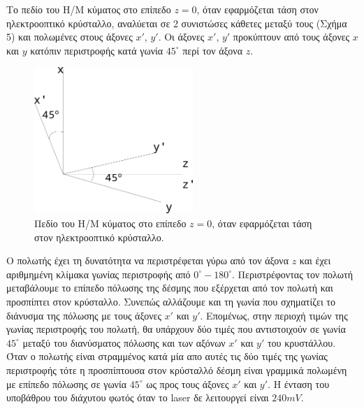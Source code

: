\documentclass[a4paper,11pt,titlepage]{article}
\newcommand{\degrees}{^{\circ}}
\begin{document}
Το πεδίο του Η/Μ κύματος στο επίπεδο $z=0$, όταν εφαρμόζεται τάση στον ηλεκτροοπτικό κρύσταλλο, αναλύεται σε 2 συνιστώσες κάθετες μεταξύ τους (Σχήμα 5) και πολωμένες στους άξονες $x'$, $y'$. Οι άξονες $x'$, $y'$ προκύπτουν από τους άξονες $x$ και $y$ κατόπιν περιστροφής κατά γωνία $45\degrees$ περί τον άξονα $z$.

\begin{figure} [hp]
\centering
\includegraphics[width=60mm]{aksones.png}
\caption{Πεδίο του Η/Μ κύματος στο επίπεδο $z=0$, όταν εφαρμόζεται τάση στον ηλεκτροοπτικό κρύσταλλο.}
\end{figure}

Ο πολωτής έχει τη δυνατότητα να περιστρέφεται γύρω από τον άξονα $z$ και έχει αριθμημένη κλίμακα γωνίας περιστροφής από $0\degrees - 180\degrees$. Περιστρέφοντας τον πολωτή μεταβάλουμε το επίπεδο πόλωσης της δέσμης που εξέρχεται από τον πολωτή και προσπίπτει στον κρύσταλλο. Συνεπώς αλλάζουμε και τη γωνία που σχηματίζει το διάνυσμα της πόλωσης με τους άξονες $x'$ και $y'$. Επομένως, στην περιοχή τιμών της γωνίας περιστροφής του πολωτή, θα υπάρχουν δύο τιμές που αντιστοιχούν σε γωνία $45\degrees$ μεταξύ του διανύσματος πόλωσης και των αξόνων $x'$ και $y'$ του κρυστάλλου. Όταν ο πολωτής είναι στραμμένος κατά μία απο αυτές τις δύο τιμές της γωνίας περιστροφής τότε η προσπίπτουσα στον κρύσταλλό δέσμη είναι γραμμικά πολωμένη με επίπεδο πόλωσης σε γωνία $45\degrees$ ως προς τους άξονες $x'$ και $y'$. Η ένταση του υποβάθρου του διάχυτου φωτός όταν το laser δε λειτουργεί είναι $240mV$.
\end{document}
